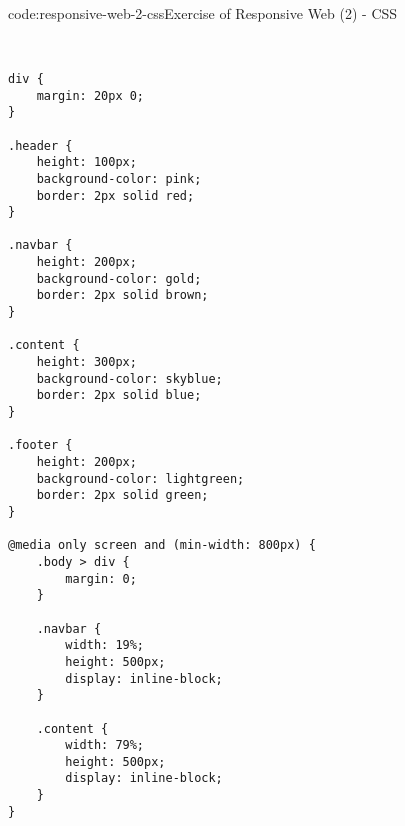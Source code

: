 \begin{codeenv}{code:responsive-web-2-css}{Exercise of Responsive Web (2) - CSS}\begin{verbatim}


div {
    margin: 20px 0;
}

.header {
    height: 100px;
    background-color: pink;
    border: 2px solid red;
}

.navbar {
    height: 200px;
    background-color: gold;
    border: 2px solid brown;
}

.content {
    height: 300px;
    background-color: skyblue;
    border: 2px solid blue;
}

.footer {
    height: 200px;
    background-color: lightgreen;
    border: 2px solid green;
}

@media only screen and (min-width: 800px) {
    .body > div {
        margin: 0;
    }

    .navbar {
        width: 19%;
        height: 500px;
        display: inline-block;
    }

    .content {
        width: 79%;
        height: 500px;
        display: inline-block;
    }
}
\end{verbatim}
\end{codeenv}
